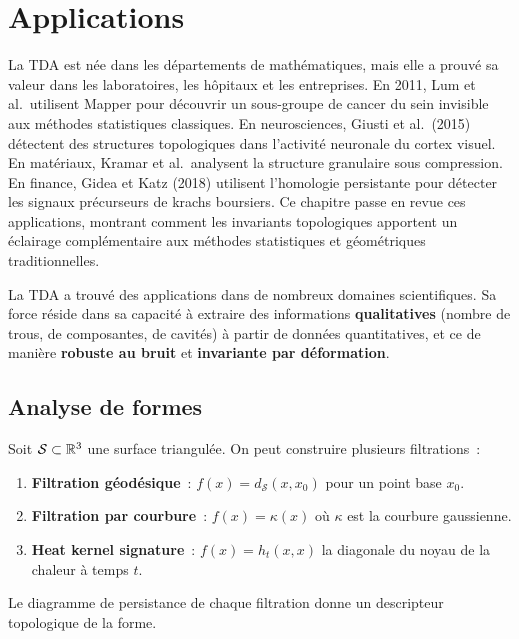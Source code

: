 \chapter{Applications}
\label{ch:applications}

La TDA est n\'ee dans les d\'epartements de math\'ematiques, mais elle a prouv\'e sa valeur dans les laboratoires, les h\^opitaux et les entreprises. En 2011, Lum et al.\ utilisent Mapper pour d\'ecouvrir un sous-groupe de cancer du sein invisible aux m\'ethodes statistiques classiques. En neurosciences, Giusti et al.\ (2015) d\'etectent des structures topologiques dans l'activit\'e neuronale du cortex visuel. En mat\'eriaux, Kramar et al.\ analysent la structure granulaire sous compression. En finance, Gidea et Katz (2018) utilisent l'homologie persistante pour d\'etecter les signaux pr\'ecurseurs de krachs boursiers. Ce chapitre passe en revue ces applications, montrant comment les invariants topologiques apportent un \'eclairage compl\'ementaire aux m\'ethodes statistiques et g\'eom\'etriques traditionnelles.

\begin{intuition}
La TDA a trouv\'e des applications dans de nombreux domaines
scientifiques. Sa force r\'eside dans sa capacit\'e \`a extraire
des informations \textbf{qualitatives} (nombre de trous, de
composantes, de cavit\'es) \`a partir de donn\'ees quantitatives,
et ce de mani\`ere \textbf{robuste au bruit} et
\textbf{invariante par d\'eformation}.
\end{intuition}

\section{Analyse de formes}
\label{sec:formes}

\begin{definition}
Soit $\mathcal{S} \subset \mathbb{R}^3$ une surface triangul\'ee. On
peut construire plusieurs filtrations~:
\begin{enumerate}
  \item \textbf{Filtration g\'eod\'esique}~: $f(x) = d_{\mathcal{S}}(x, x_0)$
        pour un point base $x_0$.
  \item \textbf{Filtration par courbure}~: $f(x) = \kappa(x)$ o\`u
        $\kappa$ est la courbure gaussienne.
  \item \textbf{Heat kernel signature}~: $f(x) = h_t(x, x)$ la
        diagonale du noyau de la chaleur \`a temps $t$.
\end{enumerate}
Le diagramme de persistance de chaque filtration donne un
descripteur topologique de la forme.
\end{definition}

